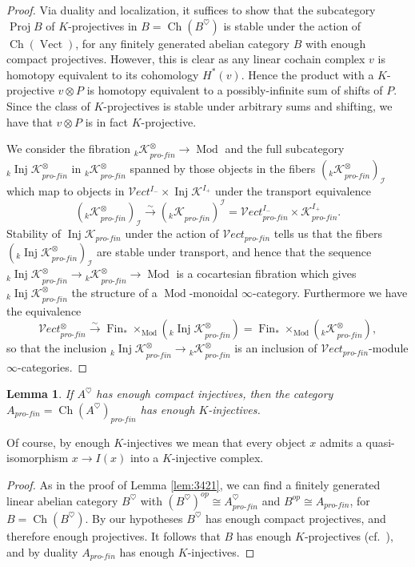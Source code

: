 \documentclass[reqno]{amsart}
\newtheorem{lemma}{Lemma}[section]
\theoremstyle{definition}
\newcommand{\mcl}[1]{\mathcal{#1}}
\newcommand{\msc}[1]{\mathscr{#1}}
\newcommand{\opn}[1]{\operatorname{#1}}
\newcommand{\ot}{\otimes}
\newcommand{\Vect}{\msc{V}\!ect}
\newcommand{\pf}{pro\text{-}fin}
\DeclareMathOperator{\Fin}{Fin}
\renewcommand{\1}{\mathbf{1}}
\begin{document}
\begin{proof}
Via duality and localization, it suffices to show that the subcategory $\opn{Proj}B$ of $K$-projectives in $B=\opn{Ch}(B^{\heartsuit})$ is stable under the action of $\opn{Ch}(\opn{Vect})$, for any finitely generated abelian category $B$ with enough compact projectives. However, this is clear as any linear cochain complex $v$ is homotopy equivalent to its cohomology $H^\ast(v)$.  Hence the product with a $K$-projective $v\ot P$ is homotopy equivalent to a possibly-infinite sum of shifts of $P$. Since the class of $K$-projectives is stable under arbitrary sums and shifting, we have that $v\ot P$ is in fact $K$-projective.
\par

We consider the fibration ${_k\msc{K}}^{\ot}_{\pf}\to \opn{Mod}$ and the full subcategory ${_k\opn{Inj}\msc{K}}_{\pf}^{\ot}$ in ${_k\msc{K}}^{\ot}_{\pf}$ spanned by those objects in the fibers $({_k\msc{K}}^{\ot}_{\pf})_{\mcl{I}}$ which map to objects in $\Vect^{I_-}\times \opn{Inj}\msc{K}^{I_+}$ under the transport equivalence
\[
({_k\msc{K}}^{\ot}_{\pf})_{\mcl{I}}\overset{\sim}\to ({_k\msc{K}}_{\pf})^{\mcl{I}}=\Vect^{I_-}_{\pf}\times \msc{K}^{I_+}_{\pf}.
\]
Stability of $\opn{Inj}\msc{K}_{\pf}$ under the action of $\Vect_{\pf}$ tells us that the fibers $({_k\opn{Inj}\msc{K}}^{\ot}_{\pf})_{\mcl{I}}$ are stable under transport, and hence that the sequence ${_k\opn{Inj}\msc{K}}^{\ot}_{\pf}\to {_k\msc{K}}^{\ot}_{\pf}\to \opn{Mod}$ is a cocartesian fibration which gives ${_k\opn{Inj}\msc{K}}^{\ot}_{\pf}$ the structure of a $\opn{Mod}$-monoidal $\infty$-category.  Furthermore we have the equivalence
\[
\Vect^{\ot}_{\pf}\overset{\sim}\to \Fin_{\ast}\times_{\opn{Mod}}({_k\opn{Inj}\msc{K}}^{\ot}_{\pf})=\Fin_{\ast}\times_{\opn{Mod}}({_k\msc{K}}^{\ot}_{\pf}),
\]
so that the inclusion ${_k\opn{Inj}\msc{K}}^{\ot}_{\pf}\to {_k\msc{K}}^{\ot}_{\pf}$ is an inclusion of $\Vect_{\pf}$-module $\infty$-categories.
\end{proof}

\begin{lemma}\label{lem:enough_inj}
If $A^{\heartsuit}$ has enough compact injectives, then the category $A_{\pf}=\opn{Ch}(A^{\heartsuit})_{\pf}$ has enough $K$-injectives.
\end{lemma}

Of course, by enough $K$-injectives we mean that every object $x$ admits a quasi-isomorphism $x\to I(x)$ into a $K$-injective complex.

\begin{proof}
As in the proof of Lemma \ref{lem:3421}, we can find a finitely generated linear abelian category $B^{\heartsuit}$ with $(B^{\heartsuit})^{op}\cong A^{\heartsuit}_{\pf}$ and $B^{op}\cong A_{\pf}$, for $B=\opn{Ch}(B^{\heartsuit})$.  By our hypotheses $B^{\heartsuit}$ has enough compact projectives, and therefore enough projectives.  It follows that $B$ has enough $K$-projectives (cf.\ \cite[Lemma 13.3]{drinfeld04}), and by duality $A_{\pf}$ has enough $K$-injectives.
\end{proof}
\end{document}
